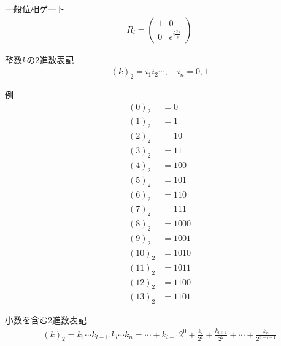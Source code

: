 \documentclass[]{ltjsarticle}
\begin{document}
一般位相ゲート
\begin{align}
    R_l
    =
    \begin{pmatrix}
        1 & 0 \\
        0 & e^{i\frac{2\pi}{2^l}}
    \end{pmatrix}
\end{align}

整数$k$の2進数表記
\begin{align}
    (k)_2 = i_1 i_2 \cdots, \quad i_n = 0, 1
\end{align}

例
\begin{align}
    (0)_2 &= 0 \\
    (1)_2 &= 1 \\
    (2)_2 &= 10 \\
    (3)_2 &= 11 \\
    (4)_2 &= 100 \\
    (5)_2 &= 101 \\
    (6)_2 &= 110 \\
    (7)_2 &= 111 \\
    (8)_2 &= 1000 \\
    (9)_2 &= 1001 \\
    (10)_2 &= 1010 \\
    (11)_2 &= 1011 \\
    (12)_2 &= 1100 \\
    (13)_2 &= 1101
\end{align}

小数を含む2進数表記
\begin{align}
    (k)_2 
    =
    k_1 \cdots k_{l-1}. k_l \cdots k_n
    =
    \cdots + k_{l-1} 2^{0}
    +
    \frac{k_l}{2^1}
    +
    \frac{k_{l+1}}{2^2}
    +
    \cdots
    +
    \frac{k_n}{2^{n-l+1}}
\end{align}
\end{document}
